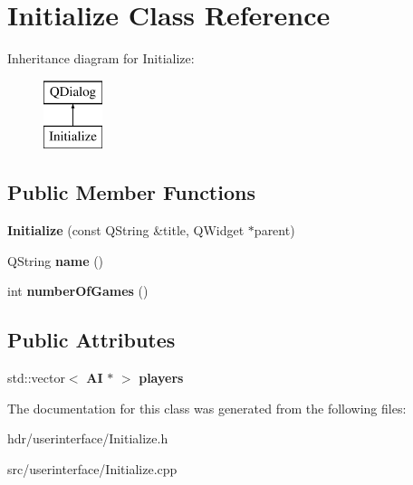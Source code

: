\section{Initialize Class Reference}
\label{class_initialize}
Inheritance diagram for Initialize\-:\begin{figure}[H]
\begin{center}
\leavevmode
\includegraphics[height=2.000000cm]{class_initialize}
\end{center}
\end{figure}
\subsection*{Public Member Functions}
\begin{DoxyCompactItemize}
\item 
{\bfseries Initialize} (const Q\-String \&title, Q\-Widget $\ast$parent)\label{class_initialize_ac74c7a2fe5cdf5499d0798d4e487f819}

\item 
Q\-String {\bfseries name} ()\label{class_initialize_aad22139b103dbcc5ba568eec9e68e270}

\item 
int {\bfseries number\-Of\-Games} ()\label{class_initialize_a3aa15f1e0f87b9abf1c76af3acb6bd60}

\end{DoxyCompactItemize}
\subsection*{Public Attributes}
\begin{DoxyCompactItemize}
\item 
std\-::vector$<$ {\bf A\-I} $\ast$ $>$ {\bfseries players}\label{class_initialize_a8dc832a3f413c754da6a550f69885bb5}

\end{DoxyCompactItemize}


The documentation for this class was generated from the following files\-:\begin{DoxyCompactItemize}
\item 
hdr/userinterface/Initialize.\-h\item 
src/userinterface/Initialize.\-cpp\end{DoxyCompactItemize}
